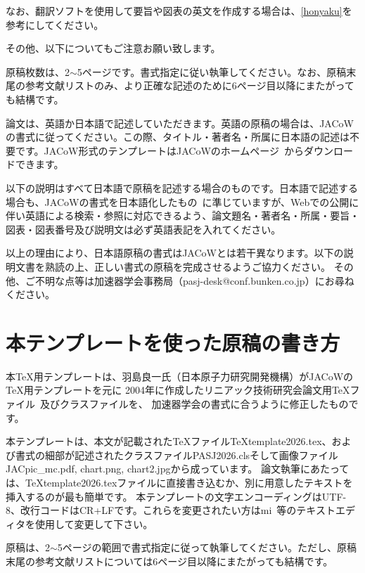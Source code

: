 \documentclass{PASJ2026}
\begin{document}
なお、翻訳ソフトを使用して要旨や図表の英文を作成する場合は、\ref{honyaku}を参考にしてください。

その他、以下についてもご注意お願い致します。
%
\begin{Itemize}
%
\item{原稿枚数は、2$\sim$5ページです。書式指定に従い執筆してください。なお、原稿末尾の参考文献リストのみ、より正確な記述のために6ページ目以降にまたがっても結構です。}
%
\end{Itemize}

論文は、英語か日本語で記述していただきます。英語の原稿の場合は、JACoWの書式に従ってください。この際、タイトル・著者名・所属に日本語の記述は不要です。JACoW形式のテンプレートはJACoWのホームページ~\cite{Reference_JACoW_Word,Reference_JACoW_TeX}からダウンロードできます。

以下の説明はすべて日本語で原稿を記述する場合のものです。日本語で記述する場合も、JACoWの書式を日本語化したもの~\cite{Reference_1,Reference_1_URL,T_Tanaka}に準じていますが、Webでの公開に伴い英語による検索・参照に対応できるよう、論文題名・著者名・所属・要旨・図表・図表番号及び説明文は必ず英語表記を入れてください。

以上の理由により、日本語原稿の書式はJACoWとは若干異なります。以下の説明文書を熟読の上、正しい書式の原稿を完成させるようご協力ください。
その他、ご不明な点等は加速器学会事務局（pasj-desk@conf.bunken.co.jp）にお尋ねください。
%
\section{本テンプレートを使った原稿の書き方}
本{\TeX}用テンプレートは、羽島良一氏（日本原子力研究開発機構）がJACoWの{\TeX}用テンプレートを元に
2004年に作成したリニアック技術研究会論文用{\TeX}ファイル~\cite{Reference_2}及びクラスファイルを、
加速器学会の書式に合うように修正したものです。

本テンプレートは、本文が記載された{\TeX}ファイルTeXtemplate2026.tex、および書式の細部が記述されたクラスファイルPASJ2026.clsそして画像ファイルJACpic\_mc.pdf, chart.png, chart2.jpgから成っています。
論文執筆にあたっては、TeXtemplate2026.texファイルに直接書き込むか、別に用意したテキストを挿入するのが最も簡単です。
本テンプレートの文字エンコーディングはUTF-8、改行コードはCR+LFです。これらを変更されたい方はmi~\cite{mi}等のテキストエディタを使用して変更して下さい。

原稿は、2$\sim$5ページの範囲で書式指定に従って執筆してください。ただし、原稿末尾の参考文献リストについては6ページ目以降にまたがっても結構です。
\end{document}
